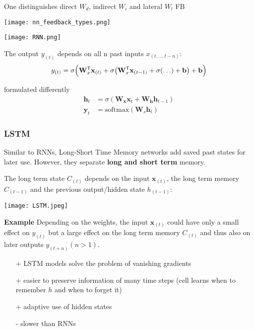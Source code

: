 One distinguishes direct $W_d$, indirect $W_i$ and lateral $W_l$ FB
\begin{center}
    \texttt{[image: nn\_feedback\_types.png]}
\end{center}
\newpar{}
\begin{center}
    \texttt{[image: RNN.png]}
\end{center}
The output $y_{(t)}$ depends on all n past inputs $x_{(t,\ldots,t-n)}$:
\noindent\begin{equation*}
    y_{(t)} = \sigma\Bigl(\mathbf{W}_x^{\mathsf{T}}\mathbf{x}_{(t)} + \sigma\bigl(\mathbf{W}_x^{\mathsf{T}}\mathbf{x}_{(t-1)} + \sigma( \ldots ) + \mathbf{b}\bigr) + \mathbf{b}\Bigr)
\end{equation*}

formulated differently
\noindent\begin{align*}
    \mathbf{h}_t &= \sigma(\mathbf{W}_\mathbf{x} \mathbf{x}_t + \mathbf{W}_\mathbf{h} \mathbf{h}_{t-1})\\
    \mathbf{y}_t &= \mathrm{softmax}(\mathbf{W}_s \mathbf{h}_t)
\end{align*}

\subsubsection{LSTM}
Similar to RNNs, Long-Short Time Memory networks add saved past states for later use. However, they separate \textbf{long and short term} memory.

The long term state $C_{(t)}$ depends on the input $\mathbf{x}_{(t)}$, the long term memory $C_{(t-1)}$ and the previous output/hidden state $h_{(t-1)}$:
\begin{center}
    \texttt{[image: LSTM.jpeg]}
\end{center}

\textbf{Example}
Depending on the weights, the input $\mathbf{x}_{(t)}$ could have only a small effect on $y_{(t)}$ but a large effect on the long term memory $C_{(t)}$ and thus also on later outputs $y_{(t+n)} (n>1)$.

\newpar{}
\begin{itemize}
    \item [+] LSTM models solve the problem of vanishing gradients
    \item [+] easier to preserve information of many time steps (cell learns when to remember $h$ and when to forget it)
    \item [+] adaptive use of hidden states
    \item [-] slower than RNNs
\end{itemize}
